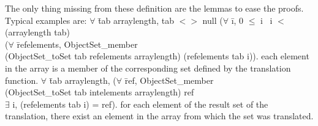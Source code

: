 The only thing missing from these definition are the lemmas to ease 
the proofs. Typical examples are: 
\btab
$\forall$ \=tab arraylength,
tab $<>$ null \rarrow 
($\forall$ \=i, 0 $\le$ i \conj \ i $<$ (arraylength tab) \rarrow \+\\
($\forall$ \=refelements, ObjectSet\_member  \+\\
(ObjectSet\_toSet tab refelements arraylength) 
(refelements tab i)). 
\etab
each element in the array  is a member of the corresponding set 
defined by the translation function.
\btab
$\forall$ \=tab arraylength,
($\forall$ \=ref,  ObjectSet\_member \+\\(ObjectSet\_toSet tab intelements arraylength)  ref
\rarrow \\
$\exists$ i, (refelements tab i) = ref). 
\etab
for each element of the result set of the translation, there exist an element in the 
array from which the set was translated.
